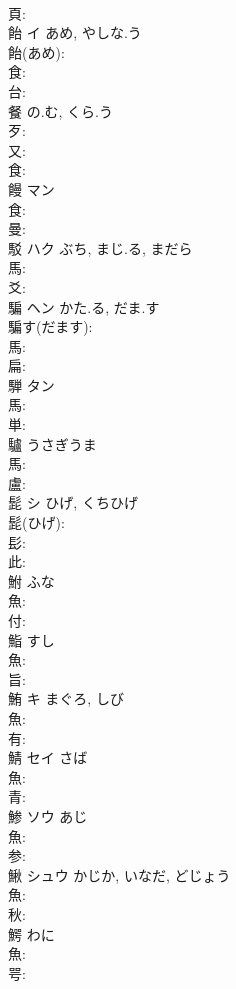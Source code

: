 \documentclass[8pt]{extreport}
\begin{document}
\begin{CJK}{UTF8}{min}
\\	頁: 
\\	飴	イ	あめ, やしな.う		
\\	飴(あめ): 
\\	食: 
\\	台: 
\\	餐		の.む, くら.う			
\\	歹: 
\\	又: 
\\	食: 
\\	饅	マン			
\\	食: 
\\	曼: 
\\	駁	ハク	ぶち, まじ.る, まだら		
\\	馬: 
\\	爻: 
\\	騙	ヘン	かた.る, だま.す		
\\	騙す(だます): 
\\	馬: 
\\	扁: 
\\	騨	タン			
\\	馬: 
\\	単: 
\\	驢		うさぎうま			
\\	馬: 
\\	盧: 
\\	髭	シ	ひげ, くちひげ		
\\	髭(ひげ): 
\\	髟: 
\\	此: 
\\	鮒		ふな			
\\	魚: 
\\	付: 
\\	鮨		すし			
\\	魚: 
\\	旨: 
\\	鮪	キ	まぐろ, しび		
\\	魚: 
\\	有: 
\\	鯖	セイ	さば		
\\	魚: 
\\	青: 
\\	鯵	ソウ	あじ		
\\	魚: 
\\	参: 
\\	鰍	シュウ	かじか, いなだ, どじょう		
\\	魚: 
\\	秋: 
\\	鰐		わに			
\\	魚: 
\\	咢: 

\end{CJK}
\end{document}
